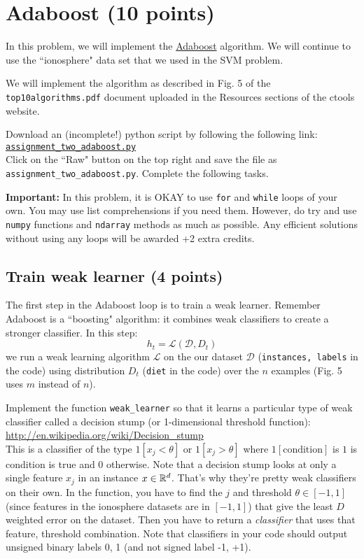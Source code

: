 \documentclass{article}
\begin{document}
\section{Adaboost (10 points)}

In this problem, we will implement the \href{http://en.wikipedia.org/wiki/AdaBoost}{Adaboost} algorithm.
We will continue to use the ``ionosphere" data set that we used in the SVM problem.

We will implement the algorithm as described in Fig. 5 of the {\tt top10algorithms.pdf} document uploaded in the Resources sections 
of the ctools website.

Download an (incomplete!) python script by following the following
link:\\
\href{https://github.com/ambujtewari/stats607a-fall2015/blob/master/homeworks/assignment\_two\_adaboost.py}{\tt assignment\_two\_adaboost.py} \\
Click on the ``Raw" button on the top right and save the file as {\tt assignment\_two\_adaboost.py}.
Complete the following tasks.

{\bf Important:} In this problem, it is OKAY to use {\tt for} and {\tt while} loops of your own. You may use list comprehensions if you need them.
However, do try and use {\tt numpy} functions and {\tt ndarray} methods as much as possible. Any efficient solutions without using any loops
will be awarded +2 extra credits.

\subsection{Train weak learner (4 points)}

The first step in the Adaboost loop is to train a weak learner. Remember Adaboost is a ``boosting" algorithm: it combines weak classifiers 
to create a stronger classifier. In this step:
$$
h_t = \mathcal{L}(\mathcal{D}, D_t)
$$
we run a weak learning algorithm $\mathcal{L}$ on the our dataset $\mathcal{D}$ ({\tt instances, labels} in the code) using distribution
$D_t$ ({\tt diet} in the code) over the $n$ examples (Fig. 5 uses $m$ instead of $n$).

Implement the function {\tt weak\_learner} so that it learns a particular type of weak classifier called a decision stump (or 1-dimensional
threshold function):\\
\url{http://en.wikipedia.org/wiki/Decision\_stump}\\
This is a classifier of the type $1[x_j < \theta]$ or $1[x_j > \theta]$ where $1[\text{condition}]$ is $1$ is condition is true and $0$ otherwise.
Note that a decision stump looks at only a single feature $x_j$ in an instance $x \in \mathbb{R}^d$. That's why they're pretty weak classifiers
on their own. In the function, you have to find the $j$ and threshold $\theta \in [-1,1]$ (since features in the ionosphere
datasets are in $[-1,1]$) that give the least $D$ weighted error on the dataset. Then you have to return a \emph{classifier}
that uses that feature, threshold combination. Note that classifiers in your code should output unsigned binary labels 0, 1
(and not signed label -1, +1).
\end{document}

